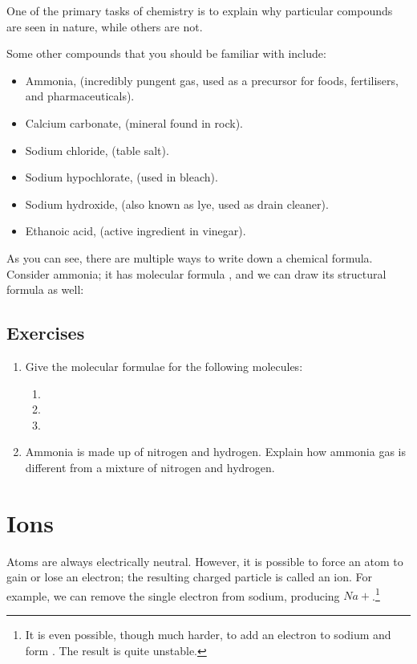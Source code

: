 \documentclass[a4paper]{memoir}
\begin{document}
One of the primary tasks of chemistry is to explain why particular compounds are seen in nature, while others are not.

Some other compounds that you should be familiar with include:
\begin{itemize}
  \item Ammonia,  (incredibly pungent gas, used as a precursor for foods, fertilisers, and pharmaceuticals).
  \item Calcium carbonate,  (mineral found in rock).
  \item Sodium chloride,  (table salt).
  \item Sodium hypochlorate,  (used in bleach).
  \item Sodium hydroxide,  (also known as lye, used as drain cleaner).
  \item Ethanoic acid,  (active ingredient in vinegar).
\end{itemize}

As you can see, there are multiple ways to write down a chemical formula. Consider ammonia; it has
molecular formula , and we can draw its structural formula as well:
\begin{center}
\end{center}

\subsection*{Exercises}
\begin{enumerate}
  \item Give the molecular formulae for the following molecules:
    \begin{enumerate}
      \item {}
      \item {}
      \item {}
    \end{enumerate}
  \item Ammonia is made up of nitrogen and hydrogen. Explain how ammonia gas is different from a mixture of nitrogen and hydrogen.
\end{enumerate}

\section{Ions}
Atoms are always electrically neutral. However, it is possible to force an atom to gain or lose an electron; the resulting charged particle is called
an ion. For example, we can remove the single electron from sodium, producing $ Na+ $.\footnote{It is even possible, though much harder, to add an electron
to sodium and form . The result is quite unstable.}
\end{document}
